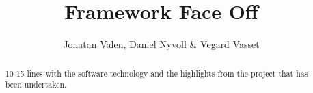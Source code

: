\documentclass[11pt]{article}
\begin{document}
\title{Framework Face Off}

\author{Jonatan Valen, Daniel Nyvoll & Vegard Vasset}

\maketitle

\begin{abstract}

  10-15 lines with the software technology and the highlights from the
  project that has been undertaken.

\end{abstract}

%














{}
\end{document}
